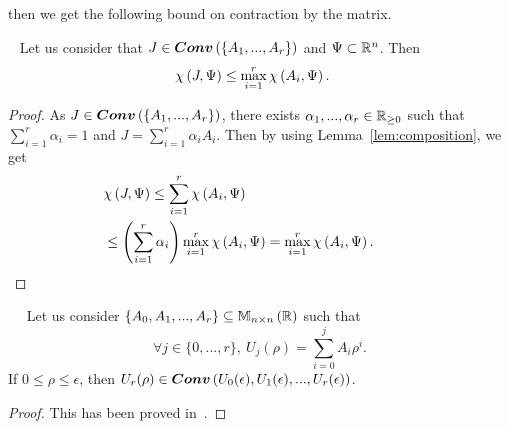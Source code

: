 then we get the following bound on contraction by the matrix.
%
\begin{lemma}~\label{lem:conv-bound}
Let us consider that $J\in\bm{Conv}\left(\left\{A_1,...,A_r\right\}\right)$ and
$\Psi\subset\mathbb{R}^n$.  Then
%
\begin{align*}
& \chi\left(J,\Psi\right)\leq\max_{i=1}^r\chi\left(A_i,\Psi\right).
\end{align*}
%
\end{lemma}
%
\begin{proof}
As $J\in\bm{Conv}\left(\left\{A_1,...,A_r\right\}\right)$, there exists
$\alpha_1,...,\alpha_r\in\mathbb{R}_{\geq 0}$ such that
$\sum_{i=1}^r\alpha_i=1$ and $J=\sum_{i=1}^r\alpha_iA_i$.  Then by
using Lemma~\ref{lem:composition}, we get
%
\begin{align*}
  & \chi\left(J,\Psi\right)\leq\sum_{i=1}^r\chi\left(A_i,\Psi\right)\\
  & \leq \left(\sum_{i=1}^r\alpha_i\right)\max_{i=1}^r\chi\left(A_i,\Psi\right)=\max_{i=1}^r\chi\left(A_i,\Psi\right).\hspace{3em}\qedhere
\end{align*}
%
\end{proof}
%
\begin{lem}~\label{lem:convex}~\cite{todo}
Let us consider $\left\{A_0,A_1,...,A_r\right\}\subseteq\mathbb{M}_{n\times n}\left(\mathbb{R}\right)$ such
that 
%
\[
\forall j\in\{0,...,r\},~ U_j(\rho)=\sum_{i=0}^jA_i\rho^i.
\]
%
If
$0\leq\rho\leq \epsilon$, then $U_r(\rho)\in
\bm{Conv}\left(U_0(\epsilon),U_1(\epsilon),...,U_r(\epsilon)\right)$.
\end{lem}
\begin{proof}
This has been proved in~\cite{todo}.
\end{proof}

